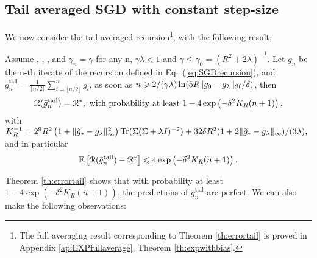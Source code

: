 \subsection{Tail averaged SGD with constant step-size}
We now consider the tail-averaged recursion\footnote{The full averaging result corresponding to Theorem \ref{th:errortail} is proved in Appendix \ref{ap:EXPfullaverage}, Theorem \ref{th:expwithbias}.}, with the following result:

\begin{theorem}
\label{th:errortail}
Assume , , ,  and $\gamma_n = \gamma$ for any n, $\gamma\lambda < 1$ and $\gamma \leqslant \gamma_0 = (R^2 + 2\lambda)^{-1}$. Let $g_n$ be the n-th iterate of the recursion defined in Eq.~(\ref{eq:SGDrecursion}), and $\bar{g}_n^{\textrm {tail}} = \frac{1}{\lfloor n/2 \rfloor} \sum_{i=\lfloor n/2 \rfloor}^{n} g_i$, as soon as $ n \geqslant 2/(\gamma\lambda)\ln (5R \|g_0-g_\lambda\|_{\mathcal H}/\delta)$, then 
$$ {\cal R}(\bar{g}_n^{\textrm {tail}}) = {\cal R}^*, \mbox{ with probability at least }1-4\exp\left( - \delta^2 K_R (n+1)\right),$$
with $K_R^{-1} =2^9 R ^2  \left(1+\|\tilde{g}_*- g_\lambda\|^2_\infty\right)\operatorname{Tr}(\Sigma(\Sigma + \lambda I)^{-2})+32 \delta R^2 ( 1 + 2 \| \tilde{g}_* - g_\lambda\|_\infty )/ (3\lambda),$ and in particular
$$ \mathbb{E}\left[{{\cal R}(\bar{g}_n^{\textrm {tail}}) - {\cal R}^*}\right] \leqslant 4\exp\left( - \delta^2 K_R (n+1)\right).$$
\end{theorem}
%
\clearpage
Theorem \ref{th:errortail} shows that  with probability at least $1-4\exp\left( - \delta^2 K_R (n+1)\right)$, the predictions of $\bar{g}_n^{\textrm {tail}}$ are perfect. We can also make the following observations:
\vspace{-0.2cm}
\BIT
\itemsep-3pt
 
